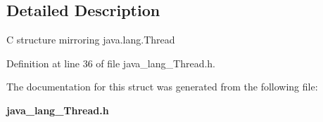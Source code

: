 \subsection{Detailed Description}
C structure mirroring java.lang.Thread 

Definition at line 36 of file java\_\-lang\_\-Thread.h.



The documentation for this struct was generated from the following file:\begin{DoxyCompactItemize}
\item 
{\bf java\_\-lang\_\-Thread.h}\end{DoxyCompactItemize}
